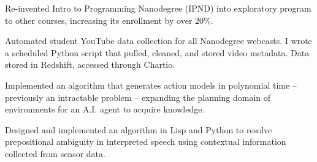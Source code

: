 \documentclass[]{deedy-resume-openfont}
\begin{document}
\begin{minipage}[t]{0.66\textwidth}
\begin{tightemize}

\item Re-invented Intro to Programming Nanodegree (IPND) into exploratory program to other courses, increasing its enrollment by over 20\%.


\item Automated student YouTube data collection for all Nanodegree webcasts. I wrote a scheduled Python script that pulled, cleaned, and stored video metadata. Data stored in Redshift, accessed through Chartio.
\end{tightemize}
\sectionsep

\begin{tightemize}
\item Implemented an algorithm that generates action models in polynomial time -- previously an intractable problem -- expanding the planning domain of environments for an A.I. agent to acquire knowledge.

\item Designed and implemented an algorithm in Lisp and Python to resolve prepositional ambiguity in interpreted speech using contextual information collected from sensor data.
\end{tightemize}
\sectionsep





\end{minipage}
\end{document}
